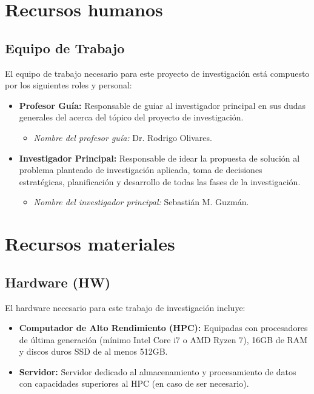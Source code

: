 
\section{Recursos humanos}
\label{sc:RH}

\subsection{Equipo de Trabajo}

El equipo de trabajo necesario para este proyecto de investigación está compuesto por los siguientes roles y personal:

\begin{itemize}
    \item \textbf{Profesor Guía:} Responsable de guiar al investigador principal en sus dudas generales del acerca del tópico del proyecto de investigación.
    \begin{itemize}
        \item \textit{Nombre del profesor guía:} Dr. Rodrigo Olivares.
    \end{itemize}

    \item \textbf{Investigador Principal:} Responsable de idear la propuesta de solución al problema planteado de investigación aplicada, toma de decisiones estratégicas, planificación y desarrollo de todas las fases de la investigación.
    \begin{itemize}
        \item \textit{Nombre del investigador principal:} Sebastián M. Guzmán.
    \end{itemize}

\end{itemize}






\section{Recursos materiales}
\label{sc:RM}

\subsection{Hardware (HW)}
El hardware necesario para este trabajo de investigación incluye:
\begin{itemize}
    \item \textbf{Computador de Alto Rendimiento (HPC):} Equipadas con procesadores de última generación (mínimo Intel Core i7 o AMD Ryzen 7), 16GB de RAM y discos duros SSD de al menos 512GB.
    \item \textbf{Servidor:} Servidor dedicado al almacenamiento y procesamiento de datos con capacidades superiores al HPC (en caso de ser necesario).
\end{itemize}

